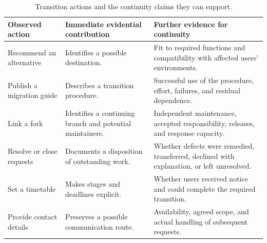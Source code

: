 \begin{table}[tbp]
\caption{Transition actions and the continuity claims they can support.}
\label{tab:ch8-transition}
\centering\small\renewcommand{\arraystretch}{1.13}
\begin{tabularx}{\linewidth}{@{}>{\raggedright\arraybackslash}p{29mm}>{\raggedright\arraybackslash}X>{\raggedright\arraybackslash}X@{}}\toprule
Observed action & Immediate evidential contribution & Further evidence for continuity\\\midrule
Recommend an alternative & Identifies a possible destination. & Fit to required functions and compatibility with affected users' environments.\\
Publish a migration guide & Describes a transition procedure. & Successful use of the procedure, effort, failures, and residual dependence.\\
Link a fork & Identifies a continuing branch and potential maintainers. & Independent maintenance, accepted responsibility, releases, and response capacity.\\
Resolve or close requests & Documents a disposition of outstanding work. & Whether defects were remedied, transferred, declined with explanation, or left unresolved.\\
Set a timetable & Makes stages and deadlines explicit. & Whether users received notice and could complete the required transition.\\
Provide contact details & Preserves a possible communication route. & Availability, agreed scope, and actual handling of subsequent requests.\\\bottomrule
\end{tabularx}
\end{table}

